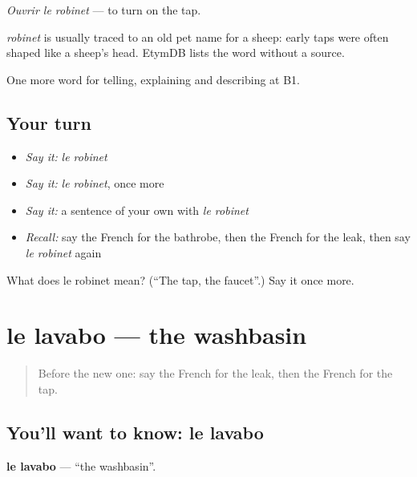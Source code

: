 \emph{Ouvrir le robinet} — to turn on the tap.

\begin{cousinweb}
\emph{robinet} is usually traced to an old pet name for a sheep: early taps were often shaped like a sheep's head. EtymDB lists the word without a source.
\end{cousinweb}

\begin{grammarlens}[title={What you've built}]
One more word for telling, explaining and describing at B1.
\end{grammarlens}

\subsection*{Your turn}
\begin{itemize}
\raggedright
  \item \emph{Say it:} \emph{le robinet}
  \item \emph{Say it:} \emph{le robinet}, once more
  \item \emph{Say it:} a sentence of your own with \emph{le robinet}
  \item \emph{Recall:} say the French for the bathrobe, then the French for the leak, then say \emph{le robinet} again
\end{itemize}

\begin{tcolorbox}[breakable,colback=teal!4,colframe=teal!35!black,title={Before you move on}]
What does le robinet mean? (\textquotedblleft{}The tap, the faucet\textquotedblright{}.) Say it once more.
\end{tcolorbox}
\section[le lavabo]{le lavabo — the washbasin}

\label{lesson:FR-C428-lavabo}



\begin{quote}
Before the new one: say the French for the leak, then the French for the tap.
\end{quote}

\subsection*{You'll want to know: le lavabo}
\textbf{le lavabo} — \textquotedblleft{}the washbasin\textquotedblright{}.

